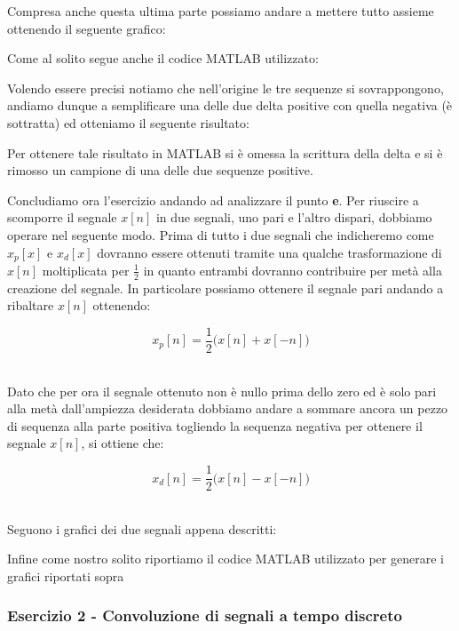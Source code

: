 \documentclass[../main.tex]{subfiles}
\begin{document}
Compresa anche questa ultima parte possiamo andare a mettere tutto assieme ottenendo il seguente grafico:


Come al solito segue anche il codice MATLAB utilizzato:



Volendo essere precisi notiamo che nell'origine le tre sequenze si sovrappongono, andiamo dunque a semplificare una delle due delta positive con quella negativa (è sottratta) ed otteniamo il seguente risultato:


Per ottenere tale risultato in MATLAB si è omessa la scrittura della delta e si è rimosso un campione di una delle due sequenze positive.

Concludiamo ora l'esercizio andando ad analizzare il punto \textbf{e}.
Per riuscire a scomporre il segnale $x[n]$ in due segnali, uno pari e l'altro dispari, dobbiamo operare nel seguente modo.
Prima di tutto i due segnali che indicheremo come $x_p[x]$ e $x_d[x]$ dovranno essere ottenuti tramite una qualche trasformazione di $x[n]$ moltiplicata per $\tfrac{1}{2}$ in quanto entrambi dovranno contribuire per metà alla creazione del segnale.
In particolare possiamo ottenere il segnale pari andando a ribaltare $x[n]$ ottenendo:

\[x_p[n] = \frac{1}{2}\big(x[n] + x[-n]\big)\]\

Dato che per ora il segnale ottenuto non è nullo prima dello zero ed è solo pari alla metà dall'ampiezza desiderata dobbiamo andare a sommare ancora un pezzo di sequenza alla parte positiva togliendo la sequenza negativa per ottenere il segnale $x[n]$, si ottiene che:

\[x_d[n] = \frac{1}{2}\big( x[n] - x[-n] \big) \]\

Seguono i grafici dei due segnali appena descritti:


Infine come nostro solito riportiamo il codice MATLAB utilizzato per generare i grafici riportati sopra



\subsubsection{Esercizio 2 - Convoluzione di segnali a tempo discreto}
\end{document}

